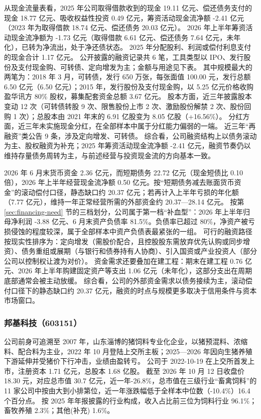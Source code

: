  从现金流量表看，2025 年公司取得借款收到的现金 19.11 亿元、偿还债务支付的现金 18.77 亿元、吸收权益性投资 0.49 亿元，筹资活动现金流净额 -2.41 亿元（2023 年为取得借款 18.74 亿元、偿还债务 20.03 亿元）。 2026 年上半年筹资活动现金流净额为 -1.73 亿元（取得借款 6.61 亿元、偿还债务 7.64 亿元，未年化），已转为净流出，处于净还债状态。 2025 年分配股利、利润或偿付利息支付的现金合计 1.17 亿元。 公开披露的融资记录共 6 笔，工具类型以 IPO、发行股份及支付现金购、可转债、定向增发为主；金额与用途见下表。 其中规模最大的两笔为：2018 年 3 月，可转债，发行 650 万张，每张面值 100.00 元，发行总额 6.50 亿元（6.50 亿元）；2015 年，发行股份及支付现金购，以 5.25 亿元价格收购盈华讯方 80\% 股权，募集配套资金总额 3.67 亿元。 股本方面，近三年披露股本变动 12 次（可转债转股 9 次、限售股份上市 2 次、激励股份解禁 2 次、股份回购 1 次）；总股本由 2021 年末的 6.91 亿股变为 8.05 亿股（+16.56\%）。 分红方面，近三年未实施现金分红，在全部样本中属于分红能力偏弱的一端。 近三年“再融资”类公告 9 条，涉及定向增发、可转债。 综合看，公司融资结构上以债务滚动为主、股权融资为补充；2025 年筹资活动现金流净额 -2.41 亿元，融资节奏仍以维持存量债务周转为主，与前述经营与投资现金流的方向基本一致。

 2026 年 6 月末货币资金 2.36 亿元，而短期债务 22.72 亿元（现金短债比 0.10 倍），2026 年上半年经营现金流净额 0.50 亿元。按“短期债务减去账面货币资金”的滚动偿付口径，静态缺口约 20.37 亿元；若再计入上半年亏损的年化额（7.77 亿元），维持一年正常经营所需的外部资金约 20.37---28.14 亿元。 按第 \ref{sec:financing-need} 节的三档划分，公司属于第一档“补血型”：2026 年上半年归母净利润 -3.88 亿元、6 月末资产负债率 81.5\%。负债率已超过 80\%，净资产被亏损侵蚀的程度较深，属于全部样本中资产负债表最紧张的一组。 可行的融资路径按现实性排序为：定向增发（需股价配合，且控股股东需放弃优先认购或同步增资）、债务重组或展期（与银行和债券持有人协商）、引入国资或产业投资人（部分公司以控制权让渡为对价）。 资金需求还要叠加在建工程：期末在建工程 0.76 亿元、2026 年上半年购建固定资产等支出 1.06 亿元（未年化），这部分支出在周期底部通常会被主动放缓。 综合看，公司的外部资金需求以债务接续为主，滚动偿付口径下的静态缺口约 20.37 亿元，融资的时点与规模更多取决于信用条件与资本市场窗口。




\subsubsection{邦基科技（603151）}
\label{co:603151}

 公司前身可追溯至 2007 年，山东淄博的猪饲料专业化企业，以猪预混料、浓缩料、配合料为主业，2022 年 10 月登陆上交所主板；2025—2026 年因向生猪养殖下游延伸并受猪价下行冲击，业绩由盈转亏。 公司于 2022-10-19 在上交所首发上市，注册资本 1.71 亿元，总股本 1.68 亿股。 截至 2026 年 10 月 12 日收盘价 18.30 元，对应总市值 30.7 亿元，近一年-26.8\%，总市值在三级行业“畜禽饲料”的 11 家公司中按由大到小排第位，近一年涨跌幅低于全样本中位数（-10.4\%）16.4 个百分点。 按 2025 年年报披露的行业构成，收入占比前三位为饲料行业 96.1\%；畜牧养殖 2.3\%；其他(补充) 1.6\%。


